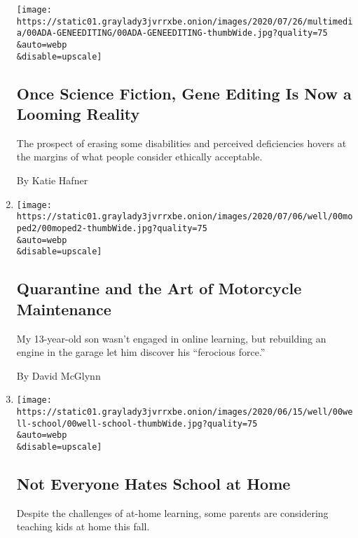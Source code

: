 \begin{enumerate}
  \texttt{[image: https://static01.graylady3jvrrxbe.onion/images/2020/07/26/multimedia/00ADA-GENEEDITING/00ADA-GENEEDITING-thumbWide.jpg?quality=75\\\&auto=webp\\\&disable=upscale]}

  \hypertarget{once-science-fiction-gene-editing-is-now-a-looming-reality}{%
  \subsection{Once Science Fiction, Gene Editing Is Now a Looming
  Reality}\label{once-science-fiction-gene-editing-is-now-a-looming-reality}}

  The prospect of erasing some disabilities and perceived deficiencies
  hovers at the margins of what people consider ethically acceptable.

  By Katie Hafner
\item
  \href{/2020/07/21/well/family/moped-quarantine-middle-school.html}{}

  \texttt{[image: https://static01.graylady3jvrrxbe.onion/images/2020/07/06/well/00moped2/00moped2-thumbWide.jpg?quality=75\\\&auto=webp\\\&disable=upscale]}

  \hypertarget{quarantine-and-the-art-of-motorcycle-maintenance}{%
  \subsection{Quarantine and the Art of Motorcycle
  Maintenance}\label{quarantine-and-the-art-of-motorcycle-maintenance}}

  My 13-year-old son wasn't engaged in online learning, but rebuilding
  an engine in the garage let him discover his ``ferocious force.''

  By David McGlynn
\item
  \href{/2020/07/16/well/family/not-everyone-hates-school-at-home.html}{}

  \texttt{[image: https://static01.graylady3jvrrxbe.onion/images/2020/06/15/well/00well-school/00well-school-thumbWide.jpg?quality=75\\\&auto=webp\\\&disable=upscale]}

  \hypertarget{not-everyone-hates-school-at-home}{%
  \subsection{Not Everyone Hates School at
  Home}\label{not-everyone-hates-school-at-home}}

  Despite the challenges of at-home learning, some parents are
  considering teaching kids at home this fall.


\end{enumerate}
